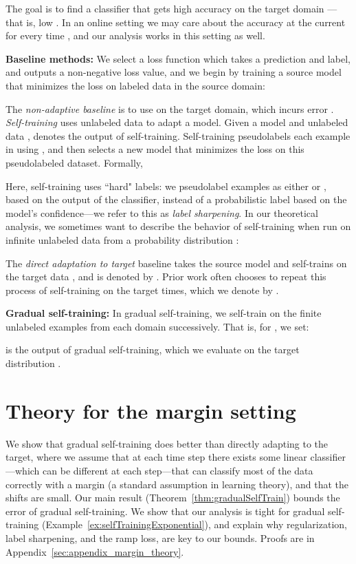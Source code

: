 \documentclass[11pt]{article}
\newcommand{\pl}[1]{}
\newcommand{\ak}[1]{}
\begin{document}
The goal is to find a classifier  that gets high accuracy on the target domain ---that is, low .
In an online setting we may care about the accuracy at the current  for every time , and our analysis works in this setting as well.

\textbf{Baseline methods:}
We select a loss function  which takes a prediction and label, and outputs a non-negative loss value,
and we begin by training a source model  that minimizes the loss on labeled data in the source domain:


The \emph{non-adaptive baseline} is to use  on the target domain, which incurs error .
\emph{Self-training} uses unlabeled data to adapt a model.
Given a model  and unlabeled data ,  denotes the output of self-training.
Self-training pseudolabels each example in  using , and then selects a new model  that minimizes the loss on this pseudolabeled dataset.
Formally,


Here, self-training uses ``hard" labels: we pseudolabel examples as either  or , based on the output of the classifier, instead of a probabilistic label based on the model's confidence---we refer to this as \emph{label sharpening}.
In our theoretical analysis, we sometimes want to describe the behavior of self-training when run on infinite unlabeled data from a probability distribution :


The \emph{direct adaptation to target} baseline takes the source model  and self-trains on the target data , and is denoted by . Prior work often chooses to repeat this process of self-training on the target  times, which we denote by .

\textbf{Gradual self-training:} In gradual self-training, we self-train on the finite unlabeled examples from each domain successively. That is, for , we set:

 is the output of gradual self-training, which we evaluate on the target distribution .

\pl{should we admit that GST actually uses more data, but that we can adjust? I'm on the fence about not complicating things but also pre-empting readers' worries}
\ak{Would prefer not complicating things here!}
 
\section{Theory for the margin setting}
\label{sec:margin_theory}

We show that gradual self-training does better than directly adapting to the target, where we assume that at each time step there exists some linear classifier---which can be different at each step---that can classify most of the data correctly with a margin (a standard assumption in learning theory), and that the shifts are small. Our main result (Theorem~\ref{thm:gradualSelfTrain}) bounds the error of gradual self-training.
We show that our analysis is tight for gradual self-training (Example~\ref{ex:selfTrainingExponential}), and explain why regularization, label sharpening, and the ramp loss, are key to our bounds.
Proofs are in Appendix~\ref{sec:appendix_margin_theory}.
\end{document}
